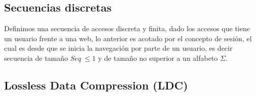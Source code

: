 



\subsection{Secuencias discretas}

Definimos una secuencia de accesos discreta y finita, dado los accesos que tiene un usuario frente a una web, lo anterior es acotado por el concepto de sesión, el cual es desde que se inicia la navegación por parte de un usuario, es decir secuencia de tamaño $Seq\ \leq 1$ y de tamaño no superior a un alfabeto $\Sigma$.



\subsection{Lossless Data Compression (LDC)}

